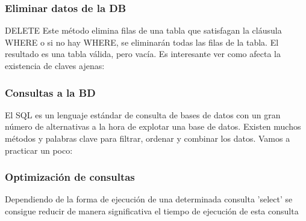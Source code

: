 \documentclass{classes/beamer_GeomaticaUA}
\begin{document}
\begin{frame}[fragile]
\frametitle{Eliminar datos de la DB}

\begin{block}{DELETE}
Este método elimina filas de una tabla que satisfagan la cláusula WHERE o si no hay WHERE, se eliminarán todas las filas de la tabla. El resultado es una tabla válida, pero vacía. Es interesante ver como afecta la existencia de claves ajenas:
\end{block}



\end{frame}


\begin{frame}[fragile]
\frametitle{Consultas a la BD}

El SQL es un lenguaje estándar de consulta de bases de datos con un gran número de alternativas a la hora de explotar una base de datos. Existen muchos métodos y palabras clave para filtrar, ordenar y combinar los datos. Vamos a practicar un poco:



\end{frame}

\begin{frame}[fragile]
\frametitle{Optimización de consultas}

Dependiendo de la forma de ejecución de una determinada consulta 'select' se consigue reducir de manera significativa el tiempo de ejecución de esta consulta



\end{frame}
\end{document}
